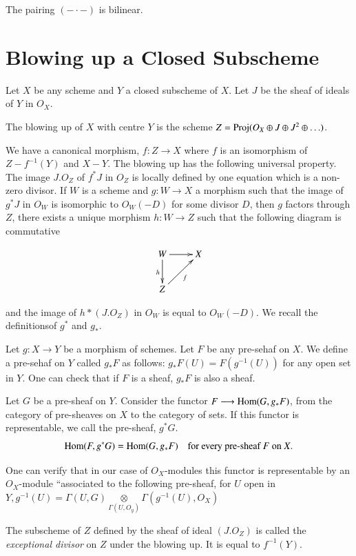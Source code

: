 The pairing $(- \cdotp -)$ is bilinear. 

\section{Blowing up a Closed Subscheme}\label{chap2:sec2}
 Let $X$ be
any scheme and $Y$ a closed subscheme of $X$. Let $J$ be the sheaf of
ideals of $Y$ in $O_X$.
\begin{def*}
The blowing up of $X$ with centre $Y$ is the scheme $Z=\operatorname{Proj}(O_X\oplus
J\oplus J^2\oplus\ldots)$. 
\end{def*}

We have a canonical morphism, $f:Z\longrightarrow X$ where $f$ is an
isomorphism of $Z-f^{-1}(Y)$ and $X-Y$. The blowing up has the
following universal property. The image $J.O_Z$ of $f^*J$ in $O_Z$ is
locally defined by one equation which is a non-zero divisor. If $W$ is
a scheme and $g:W\longrightarrow X$ a morphism such that the image of
$g^*J$ in $O_W$ is isomorphic to $O_W(-D)$ for some divisor $D$, then
$g$ factors through $Z$, \ie there exists a unique morphism
$h:W\longrightarrow Z$ such that the following diagram is commutative

\[
\xymatrix{
W \ar[r] \ar[d]_h & X\\
Z\ar[ur]_f 
}
\]

and the image of $h*(J.O_Z)$ in $O_W$ is equal to $O_W(-D)$. We recall
the definitions\pageoriginale of $g^*$ and $g_*$.

Let $g:X\longrightarrow Y$ be a morphism of schemes. Let $F$ be any
pre-sehaf on $X$. We define a pre-sehaf on $Y$ called $g_*F$ as
follows: $g_*F(U)=F(g^{-1}(U))$ for any open set in $Y$. One can check
that if $F$ is a sheaf, $g_*F$ is also a sheaf.

Let $G$ be a pre-sheaf on $Y$. Consider the functor
$F\longrightarrow\operatorname{Hom} (G,g_*F)$, from the category of pre-sheaves on
$X$ to the category of sets. If this functor is representable, we call
the pre-sheaf, $g^*G$.
$$
\operatorname{Hom}(F,g^*G)=\operatorname{Hom}(G,g_*F)\quad\text{for every pre-sheaf $F$ on $X$}.
$$

One can verify that in our case of $O_X$-modules this functor is
representable by an $O_X$-module ``associated to the following
pre-sheaf, for $U$ open in $Y,g^{-1}(U)=\Gamma(U,G)
\underset{\Gamma(U,O_y)}{\otimes}\Gamma(g^{-1}(U),O_X)$ 
\begin{def*}
The subscheme of $Z$ defined by the sheaf of ideal $(J.O_Z)$ is called
the {\it exceptional divisor} on $Z$ under the blowing up. It is equal
to $f^{-1}(Y)$. 
\end{def*}

